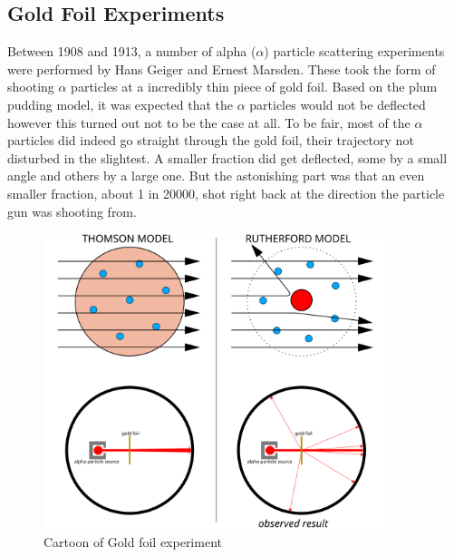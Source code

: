 \subsection{Gold Foil Experiments}

Between 1908 and  1913, a number of alpha ($\alpha$) particle scattering experiments were performed by Hans Geiger and Ernest Marsden.
These took the form of shooting $\alpha$  particles at a  incredibly thin piece of gold foil.
Based on the plum pudding model, it was expected that the $\alpha$ particles would not be deflected however this turned out not to be the case at all.
To be fair, most of the $\alpha$ particles did indeed go straight through the gold foil, their trajectory not disturbed in the slightest.
A smaller fraction did get deflected, some by a small angle and others by a large one.
But the astonishing part was that an even smaller fraction, about 1 in 20000, shot right back at the direction the particle gun was shooting from.

\begin{figure}[H]
  \centering
  \includegraphics[width=100mm]{figures/goldFoil.png}
  \caption{Cartoon of Gold foil experiment}
  \label{goldFoil}
\end{figure}


